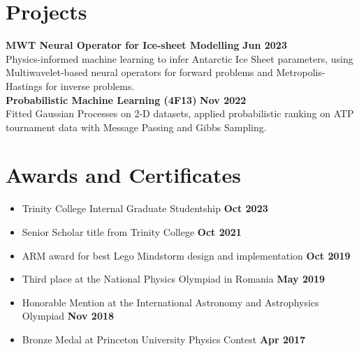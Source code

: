\documentclass{res}
\begin{document}
\begin{resume}
\section{Projects}
\textbf{MWT Neural Operator for Ice-sheet Modelling} \hfill \textbf{Jun 2023} \\
Physics-informed machine learning to infer Antarctic Ice Sheet parameters, using Multiwavelet-based neural operators for forward problems and Metropolis-Hastings for inverse problems.\\
\textbf{Probabilistic Machine Learning (4F13)} \hfill \textbf{Nov 2022} \\
Fitted Gaussian Processes on 2-D datasets, applied probabilistic ranking on ATP tournament data with Message Passing and Gibbs Sampling.\\

\section{Awards and Certificates}
\begin{itemize}
    \item Trinity College Internal Graduate Studentship \hfill{\textbf{Oct 2023}}
    \item Senior Scholar title from Trinity College \hfill{\textbf{Oct 2021}} 
    \item ARM award for best Lego Mindstorm design and implementation \hfill{\textbf{Oct 2019}} 
    \item Third place at the National Physics Olympiad in Romania \hfill{\textbf{May 2019}} 
    \item Honorable Mention at the International Astronomy and Astrophysics Olympiad \hfill{\textbf{Nov 2018}} 
    \item Bronze Medal at Princeton University Physics Contest \hfill{\textbf{Apr 2017}} 
\end{itemize}

\end{resume}
\end{document}
